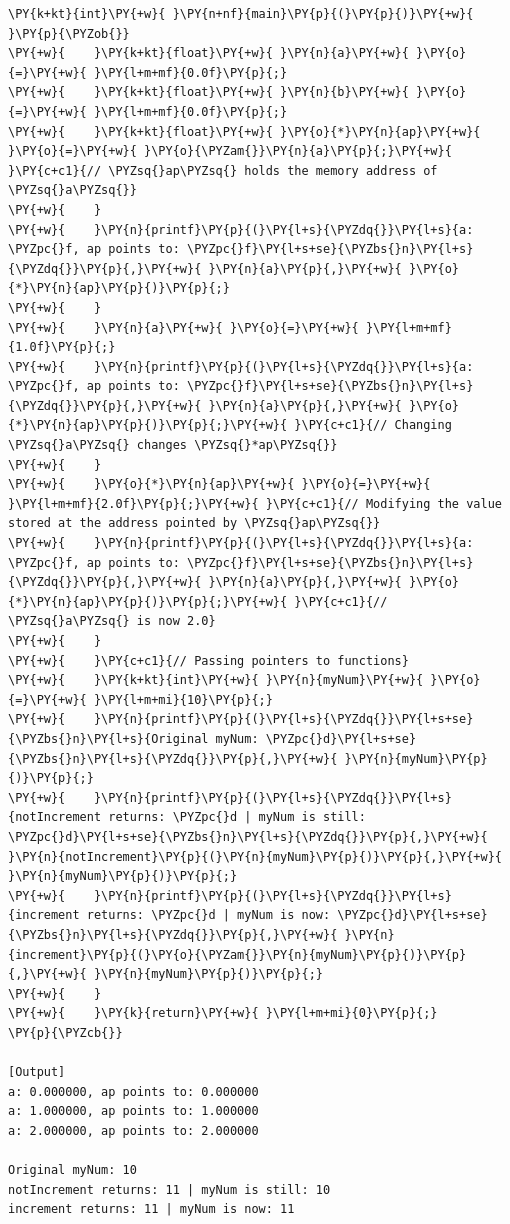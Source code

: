 \begin{Verbatim}[label=\makebox{\url{https://github.com/lucabaldini/cmepda/tree/master/slides/latex/snippets/pointers.c}},commandchars=\\\{\}]
\PY{k+kt}{int}\PY{+w}{ }\PY{n+nf}{main}\PY{p}{(}\PY{p}{)}\PY{+w}{ }\PY{p}{\PYZob{}}
\PY{+w}{    }\PY{k+kt}{float}\PY{+w}{ }\PY{n}{a}\PY{+w}{ }\PY{o}{=}\PY{+w}{ }\PY{l+m+mf}{0.0f}\PY{p}{;}
\PY{+w}{    }\PY{k+kt}{float}\PY{+w}{ }\PY{n}{b}\PY{+w}{ }\PY{o}{=}\PY{+w}{ }\PY{l+m+mf}{0.0f}\PY{p}{;}
\PY{+w}{    }\PY{k+kt}{float}\PY{+w}{ }\PY{o}{*}\PY{n}{ap}\PY{+w}{ }\PY{o}{=}\PY{+w}{ }\PY{o}{\PYZam{}}\PY{n}{a}\PY{p}{;}\PY{+w}{ }\PY{c+c1}{// \PYZsq{}ap\PYZsq{} holds the memory address of \PYZsq{}a\PYZsq{}}
\PY{+w}{    }
\PY{+w}{    }\PY{n}{printf}\PY{p}{(}\PY{l+s}{\PYZdq{}}\PY{l+s}{a: \PYZpc{}f, ap points to: \PYZpc{}f}\PY{l+s+se}{\PYZbs{}n}\PY{l+s}{\PYZdq{}}\PY{p}{,}\PY{+w}{ }\PY{n}{a}\PY{p}{,}\PY{+w}{ }\PY{o}{*}\PY{n}{ap}\PY{p}{)}\PY{p}{;}
\PY{+w}{    }
\PY{+w}{    }\PY{n}{a}\PY{+w}{ }\PY{o}{=}\PY{+w}{ }\PY{l+m+mf}{1.0f}\PY{p}{;}
\PY{+w}{    }\PY{n}{printf}\PY{p}{(}\PY{l+s}{\PYZdq{}}\PY{l+s}{a: \PYZpc{}f, ap points to: \PYZpc{}f}\PY{l+s+se}{\PYZbs{}n}\PY{l+s}{\PYZdq{}}\PY{p}{,}\PY{+w}{ }\PY{n}{a}\PY{p}{,}\PY{+w}{ }\PY{o}{*}\PY{n}{ap}\PY{p}{)}\PY{p}{;}\PY{+w}{ }\PY{c+c1}{// Changing \PYZsq{}a\PYZsq{} changes \PYZsq{}*ap\PYZsq{}}
\PY{+w}{    }
\PY{+w}{    }\PY{o}{*}\PY{n}{ap}\PY{+w}{ }\PY{o}{=}\PY{+w}{ }\PY{l+m+mf}{2.0f}\PY{p}{;}\PY{+w}{ }\PY{c+c1}{// Modifying the value stored at the address pointed by \PYZsq{}ap\PYZsq{}}
\PY{+w}{    }\PY{n}{printf}\PY{p}{(}\PY{l+s}{\PYZdq{}}\PY{l+s}{a: \PYZpc{}f, ap points to: \PYZpc{}f}\PY{l+s+se}{\PYZbs{}n}\PY{l+s}{\PYZdq{}}\PY{p}{,}\PY{+w}{ }\PY{n}{a}\PY{p}{,}\PY{+w}{ }\PY{o}{*}\PY{n}{ap}\PY{p}{)}\PY{p}{;}\PY{+w}{ }\PY{c+c1}{// \PYZsq{}a\PYZsq{} is now 2.0}
\PY{+w}{    }
\PY{+w}{    }\PY{c+c1}{// Passing pointers to functions}
\PY{+w}{    }\PY{k+kt}{int}\PY{+w}{ }\PY{n}{myNum}\PY{+w}{ }\PY{o}{=}\PY{+w}{ }\PY{l+m+mi}{10}\PY{p}{;}
\PY{+w}{    }\PY{n}{printf}\PY{p}{(}\PY{l+s}{\PYZdq{}}\PY{l+s+se}{\PYZbs{}n}\PY{l+s}{Original myNum: \PYZpc{}d}\PY{l+s+se}{\PYZbs{}n}\PY{l+s}{\PYZdq{}}\PY{p}{,}\PY{+w}{ }\PY{n}{myNum}\PY{p}{)}\PY{p}{;}
\PY{+w}{    }\PY{n}{printf}\PY{p}{(}\PY{l+s}{\PYZdq{}}\PY{l+s}{notIncrement returns: \PYZpc{}d | myNum is still: \PYZpc{}d}\PY{l+s+se}{\PYZbs{}n}\PY{l+s}{\PYZdq{}}\PY{p}{,}\PY{+w}{ }\PY{n}{notIncrement}\PY{p}{(}\PY{n}{myNum}\PY{p}{)}\PY{p}{,}\PY{+w}{ }\PY{n}{myNum}\PY{p}{)}\PY{p}{;}
\PY{+w}{    }\PY{n}{printf}\PY{p}{(}\PY{l+s}{\PYZdq{}}\PY{l+s}{increment returns: \PYZpc{}d | myNum is now: \PYZpc{}d}\PY{l+s+se}{\PYZbs{}n}\PY{l+s}{\PYZdq{}}\PY{p}{,}\PY{+w}{ }\PY{n}{increment}\PY{p}{(}\PY{o}{\PYZam{}}\PY{n}{myNum}\PY{p}{)}\PY{p}{,}\PY{+w}{ }\PY{n}{myNum}\PY{p}{)}\PY{p}{;}
\PY{+w}{    }
\PY{+w}{    }\PY{k}{return}\PY{+w}{ }\PY{l+m+mi}{0}\PY{p}{;}
\PY{p}{\PYZcb{}}

[Output]
a: 0.000000, ap points to: 0.000000
a: 1.000000, ap points to: 1.000000
a: 2.000000, ap points to: 2.000000

Original myNum: 10
notIncrement returns: 11 | myNum is still: 10
increment returns: 11 | myNum is now: 11
\end{Verbatim}